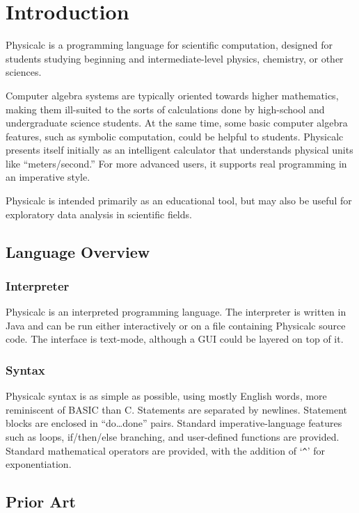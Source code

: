 \chapter{Introduction}

Physicalc is a programming language for scientific computation,
designed for students studying beginning and intermediate-level
physics, chemistry, or other sciences.  

Computer algebra systems are typically oriented towards higher
mathematics, making them ill-suited to the sorts of calculations done
by high-school and undergraduate science students.  At the same time,
some basic computer algebra features, such as symbolic computation,
could be helpful to students.  Physicalc presents itself initially as
an intelligent calculator that understands physical units like
``meters/second.''  For more advanced users, it supports real
programming in an imperative style.

Physicalc is intended primarily as an educational tool, but may also
be useful for exploratory data analysis in scientific fields.

\section{Language Overview}

\subsection{Interpreter}

Physicalc is an interpreted programming language. The interpreter is
written in Java and can be run either interactively or on a file
containing Physicalc source code.  The interface is text-mode,
although a GUI could be layered on top of it.

\subsection{Syntax}

Physicalc syntax is as simple as possible, using mostly English words,
more reminiscent of BASIC than C\@.  Statements are separated by
newlines.  Statement blocks are enclosed in ``do\dots done'' pairs.
Standard imperative-language features such as loops, if/then/else
branching, and user-defined functions are provided. Standard
mathematical operators are provided, with the addition of `\verb+^+'
for exponentiation.

\section{Prior Art}

